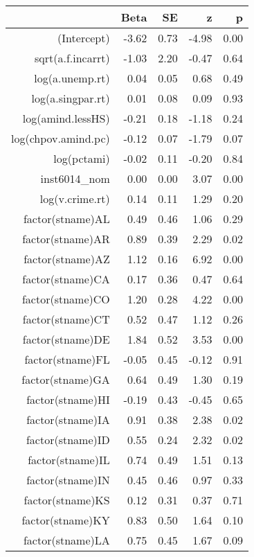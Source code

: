 \begin{table}[ht]
\centering
\begin{tabular}{rrrrr}
  \hline
 & Beta & SE & z & p \\ 
  \hline
(Intercept) & -3.62 & 0.73 & -4.98 & 0.00 \\ 
  sqrt(a.f.incarrt) & -1.03 & 2.20 & -0.47 & 0.64 \\ 
  log(a.unemp.rt) & 0.04 & 0.05 & 0.68 & 0.49 \\ 
  log(a.singpar.rt) & 0.01 & 0.08 & 0.09 & 0.93 \\ 
  log(amind.lessHS) & -0.21 & 0.18 & -1.18 & 0.24 \\ 
  log(chpov.amind.pc) & -0.12 & 0.07 & -1.79 & 0.07 \\ 
  log(pctami) & -0.02 & 0.11 & -0.20 & 0.84 \\ 
  inst6014\_nom & 0.00 & 0.00 & 3.07 & 0.00 \\ 
  log(v.crime.rt) & 0.14 & 0.11 & 1.29 & 0.20 \\ 
  factor(stname)AL & 0.49 & 0.46 & 1.06 & 0.29 \\ 
  factor(stname)AR & 0.89 & 0.39 & 2.29 & 0.02 \\ 
  factor(stname)AZ & 1.12 & 0.16 & 6.92 & 0.00 \\ 
  factor(stname)CA & 0.17 & 0.36 & 0.47 & 0.64 \\ 
  factor(stname)CO & 1.20 & 0.28 & 4.22 & 0.00 \\ 
  factor(stname)CT & 0.52 & 0.47 & 1.12 & 0.26 \\ 
  factor(stname)DE & 1.84 & 0.52 & 3.53 & 0.00 \\ 
  factor(stname)FL & -0.05 & 0.45 & -0.12 & 0.91 \\ 
  factor(stname)GA & 0.64 & 0.49 & 1.30 & 0.19 \\ 
  factor(stname)HI & -0.19 & 0.43 & -0.45 & 0.65 \\ 
  factor(stname)IA & 0.91 & 0.38 & 2.38 & 0.02 \\ 
  factor(stname)ID & 0.55 & 0.24 & 2.32 & 0.02 \\ 
  factor(stname)IL & 0.74 & 0.49 & 1.51 & 0.13 \\ 
  factor(stname)IN & 0.45 & 0.46 & 0.97 & 0.33 \\ 
  factor(stname)KS & 0.12 & 0.31 & 0.37 & 0.71 \\ 
  factor(stname)KY & 0.83 & 0.50 & 1.64 & 0.10 \\ 
  factor(stname)LA & 0.75 & 0.45 & 1.67 & 0.09 \\ 

\end{tabular}
\end{table}
